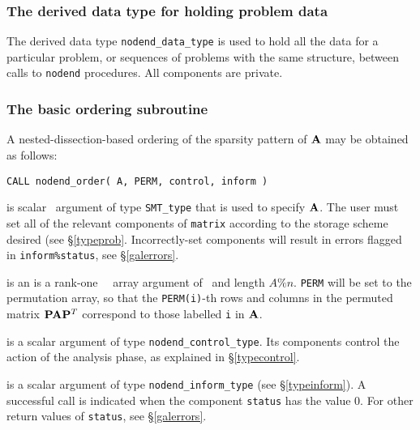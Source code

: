 \documentclass{galahad}
\newcommand{\packagename}{nodend}
\begin{document}

\subsubsection{The derived data type for holding problem data}\label{typedata}
The derived data type
{\tt \packagename\_data\_type}
is used to hold all the data for a particular problem,
or sequences of problems with the same structure, between calls to
{\tt \packagename} procedures.
All components are private.


\galarguments


\subsubsection{The basic ordering subroutine}\label{suborder}
A nested-dissection-based ordering of the sparsity pattern of ${\mathbf{A}}$ 
may be obtained as follows:
\vskip2mm

\hskip0.5in
{\tt CALL \packagename\_order( A, PERM, control, inform )}
\begin{description}
 is scalar \intentin\ argument of type {\tt SMT\_type}
that is used to specify ${\mathbf{A}}$.
The user must set all of the relevant components of {\tt matrix} according
to the storage scheme desired (see \S\ref{typeprob}.
Incorrectly-set components will result in errors
flagged in {\tt inform\%status}, see \S\ref{galerrors}.

 is an 
 is a rank-one \integer\ \intentout\ array argument
of \intentout\ and length $A\%n$.
{\tt PERM} will be set to the permutation array, so that the 
{\tt PERM(i)}-th rows and columns in the permuted matrix 
${\mathbf{P}} {\mathbf{A}} {\mathbf{P}}^T$ correspond to those labelled {\tt i} in ${\mathbf{A}}$.

 is a scalar \intentout argument of type
{\tt \packagename\_control\_type}. Its components control the action
of the analysis phase, as explained in
\S\ref{typecontrol}.

 is a scalar \intentout argument of type
{\tt \packagename\_inform\_type}
(see \S\ref{typeinform}).
A successful call is indicated when the  component {\tt status} has the value 0.
For other return values of {\tt status}, see \S\ref{galerrors}.

\end{description}
\end{document}
